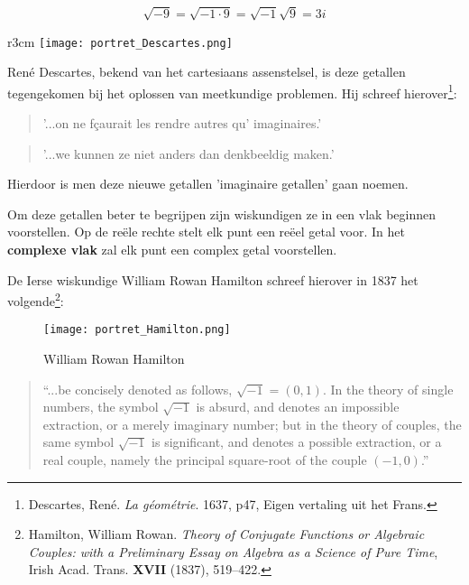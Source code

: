 \documentclass{ximera}
\begin{document}
\[ \sqrt{-9} = \sqrt{-1 \cdot 9} = \sqrt{-1} \sqrt{9} = 3i  \]


\begin{wrapfigure}{r}{3cm} 
    \texttt{[image: portret\_Descartes.png]}
\end{wrapfigure}

René Descartes, bekend van het cartesiaans assenstelsel, is deze getallen tegengekomen bij het oplossen van meetkundige problemen. Hij schreef hierover\footnote{
    Descartes, René. \textit{La géométrie}. 1637, p47, Eigen vertaling uit het Frans.
    
    }: 
    
    
    
    
    \begin{quote}
        '...on ne fçaurait les rendre autres qu’ imaginaires.' 
    \end{quote}
    
    \begin{quote}
        '...we kunnen ze niet anders dan denkbeeldig maken.'
    \end{quote}
    
    
    Hierdoor is men deze nieuwe getallen 'imaginaire getallen' gaan noemen. 
    
    \newpage
    
    Om deze getallen beter te begrijpen zijn wiskundigen ze in een vlak beginnen voorstellen. Op de reële rechte stelt elk punt een reëel getal voor. In het \textbf{complexe vlak} zal elk punt een complex getal voorstellen. 
    
    
    
    De Ierse wiskundige William Rowan Hamilton schreef hierover in 1837 het volgende\footnote{
        Hamilton, William Rowan. \textit{Theory of Conjugate Functions or Algebraic
        Couples: with a Preliminary Essay on Algebra as a Science of Pure
        Time}, Irish Acad. Trans. \textbf{XVII} (1837), 519–422.}:   
    \begin{figure}[H]
        \centering
        \texttt{[image: portret\_Hamilton.png]}
        \caption{William Rowan Hamilton}
    \end{figure}

    \begin{quote}
        “...be concisely denoted as follows, \(\sqrt{-1} = (0, 1)\). In the theory of single numbers, the symbol \(\sqrt{-1}\) is absurd, and denotes an impossible extraction, or a merely imaginary number; but in the theory of couples, the same symbol \(\sqrt{-1}\) is significant, and denotes a possible extraction, or a real couple, namely the principal square-root of the couple \((-1,0)\).”
    \end{quote}
    
\end{document}
